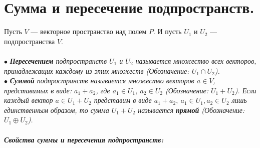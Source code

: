 \section{Сумма и пересечение подпространств.}
Пусть $V$ --- векторное пространство над полем $P$. И пусть $U_1$ и $U_2$ --- подпространства $V$.\\\\
$\bullet$ \textit{\textbf{Пересечением} подпространств $U_1$ и $U_2$ называется множество всех векторов, принадлежащих каждому из этих множеств (Обозначение: $U_1 \cap U_2$).}\\
$\bullet$ \textit{\textbf{Суммой} подпространств называется множество векторов $a\in V$, представимых в виде: $a_1+a_2$, где $a_1 \in U_1,\ a_2\in U_2$ (Обозначение: $U_1 + U_2$). Если каждый вектор $a\in U_1 + U_2$ представим в виде $a_1 + a_2,\ a_1 \in U_1, a_2 \in U_2$ лишь единственным образом, то сумма $U_1 + U_2$ называется \textbf{прямой} (Обозначение: $U_1\oplus U_2$).}\\\\
\textbf{\textit{Свойства суммы и пересечения подпространств:}}
